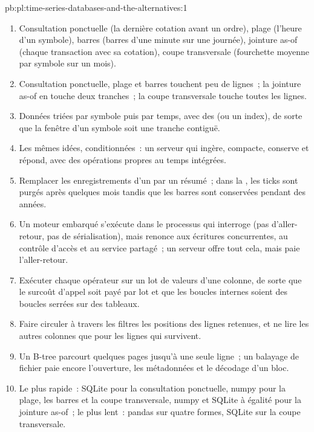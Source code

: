 \begin{solution}{pb:pl:time-series-databases-and-the-alternatives:1}
\begin{enumerate}
\item Consultation ponctuelle (la dernière cotation avant un ordre), plage (l'heure d'un symbole), barres (barres d'une minute sur une journée), jointure as-of (chaque transaction avec sa cotation),
coupe transversale (fourchette moyenne par symbole sur un mois).
\item Consultation ponctuelle, plage et barres touchent peu de lignes~; la jointure as-of en touche deux tranches~; la coupe transversale touche toutes les lignes.
\item Données triées par symbole puis par temps, avec des  (ou un index), de sorte que la fenêtre d'un symbole soit une tranche contiguë.
\item Les mêmes idées, conditionnées~: un serveur qui ingère, compacte, conserve et répond, avec des opérations propres au temps intégrées.
\item Remplacer les enregistrements d'un  par un résumé~; dans la , les ticks sont purgés après quelques mois tandis que les barres sont conservées pendant des années.
\item Un moteur embarqué s'exécute dans le processus qui interroge (pas d'aller-retour, pas de sérialisation), mais renonce aux écritures concurrentes, au contrôle d'accès
et au service partagé~; un serveur offre tout cela, mais paie l'aller-retour.
\item Exécuter chaque opérateur sur un lot de valeurs d'une colonne, de sorte que le surcoût d'appel soit payé par lot et que les boucles internes soient des boucles
serrées sur des tableaux.
\item Faire circuler à travers les filtres les positions des lignes retenues, et ne lire les autres colonnes que pour les lignes qui survivent.
\item Un B-tree parcourt quelques pages jusqu'à une seule ligne~; un balayage de fichier paie encore l'ouverture, les métadonnées et le décodage d'un bloc.
\item Le plus rapide~: SQLite pour la consultation ponctuelle, numpy pour la plage, les barres et la coupe transversale, numpy et SQLite à égalité pour la jointure as-of~; le plus lent~:
pandas sur quatre formes, SQLite sur la coupe transversale.

\end{enumerate}
\end{solution}
